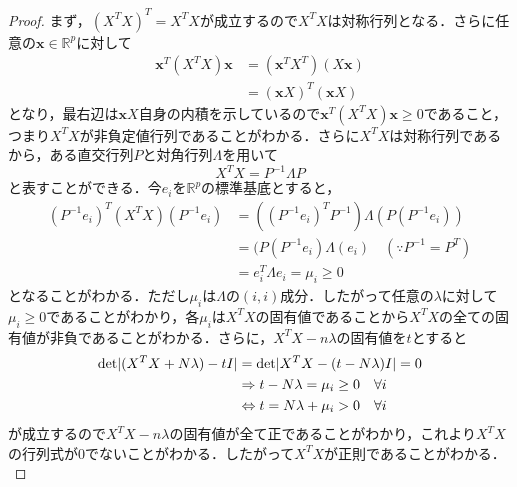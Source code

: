 \documentclass{jsarticle}
\theoremstyle{definition}
\theoremstyle{mystyle} %
\begin{document}
\begin{proof}
まず，$(X^T X)^T =X^T X$が成立するので$X^T X$は対称行列となる．さらに任意の${\bm x}\in\mathbb{R}^p$に対して
\begin{align*}
{\bm x}^T (X^T X){\bm x}&=({\bm x}^T X^T )(X{\bm x})\\
&=({\bm x}X)^T({\bm x} X)
\end{align*}
となり，最右辺は${\bm x}X$自身の内積を示しているので${\bm x}^T (X^T X){\bm x}\geq 0$であること，つまり$X^T X$が非負定値行列であることがわかる．さらに$X^T X$は対称行列であるから，ある直交行列$P$と対角行列$\Lambda$を用いて
$$X^T X = P^{-1} \Lambda P$$
と表すことができる．今$e_i $を$\mathbb{R}^p$の標準基底とすると，
\begin{align*}
(P^{-1} e_i )^T(X^T X)(P^{-1}e_i) &=((P^{-1}e_i)^T P^{-1})\Lambda (P(P^{-1}e_i))\\
&=(P(P^{-1}e_i)\Lambda (e_i)\quad (\because P^{-1}=P^T)\\
&=e_i^T \Lambda e_i = \mu_i\geq 0
\end{align*}
となることがわかる．ただし$\mu_i$は$\Lambda$の$(i,i)$成分．したがって任意の$\lambda$に対して$\mu_i\geq 0$であることがわかり，各$\mu_i$は$X^T X$の固有値であることから$X^T X$の全ての固有値が非負であることがわかる．さらに，$X^TX- n \lambda$の固有値を$t$とすると
\begin{align*}
{\rm det}|(X^T X+ N\lambda )- tI|&={\rm det}|X^T X-(t-N\lambda)I|=0\\
&\Rightarrow t-N \lambda=\mu_i\geq 0\quad \forall i\\
&\Leftrightarrow t = N\lambda +\mu_i >0  \quad \forall i
\end{align*}
が成立するので$X^TX- n \lambda$の固有値が全て正であることがわかり，これより$X^TX$の行列式が$0$でないことがわかる．したがって$X^T X$が正則であることがわかる．\\
\end{proof}
\end{document}

